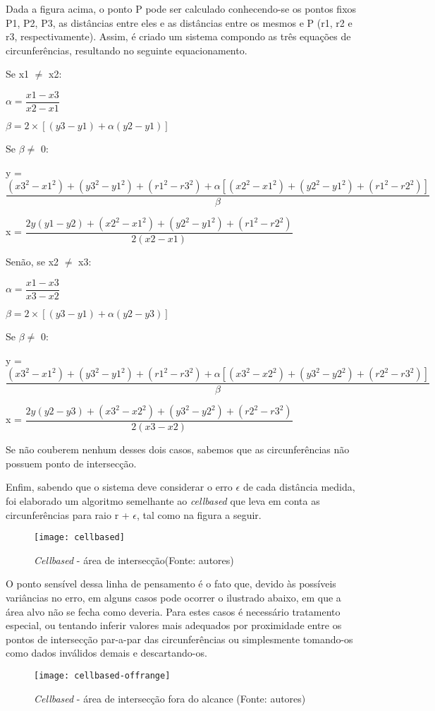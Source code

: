 Dada a figura acima, o ponto P pode ser calculado conhecendo-se os pontos fixos P1, P2, P3, as distâncias entre eles e as distâncias entre os mesmos e P (r1, r2 e r3, respectivamente). Assim, é criado um sistema compondo as três equações de circunferências, resultando no seguinte equacionamento.

Se x1 $\neq$ x2:

\quad $\alpha = \dfrac{x1 - x3}{x2 - x1}$

\quad $\beta = 2 \times [(y3 - y1) + \alpha(y2 - y1)]$

\quad Se $\beta \neq$ 0:

\quad \quad y = $\dfrac{(x3^2 - x1^2) + (y3^2 - y1^2) + (r1^2 - r3^2) + \alpha[(x2^2 - x1^2) + (y2^2 - y1^2) + (r1^2 - r2^2)]}{\beta}$

\quad \quad x = $\dfrac{2y(y1 - y2) + (x2^2 - x1^2) + (y2^2 - y1^2) + (r1^2 - r2^2)}{2(x2 - x1)}$

Senão, se x2 $\neq$ x3:

\quad $\alpha = \dfrac{x1 - x3}{x3 - x2}$

\quad $\beta = 2 \times [(y3 - y1) + \alpha(y2 - y3)]$

\quad Se $\beta \neq$ 0:

\quad \quad y = $\dfrac{(x3^2 - x1^2) + (y3^2 - y1^2) + (r1^2 - r3^2) + \alpha[(x3^2 - x2^2) + (y3^2 - y2^2) + (r2^2 - r3^2)]}{\beta}$

\quad \quad x = $\dfrac{2y(y2 - y3) + (x3^2 - x2^2) + (y3^2 - y2^2) + (r2^2 - r3^2)}{2(x3 - x2)}$

Se não couberem nenhum desses dois casos, sabemos que as circunferências não possuem ponto de intersecção.

Enfim, sabendo que o sistema deve considerar o erro $\epsilon$ de cada distância medida, foi elaborado um algoritmo semelhante ao \emph{cellbased} \cite{larissaamaralmiltonbiscaro} que leva em conta as circunferências para raio r + $\epsilon$, tal como na figura a seguir.

\begin{figure}[ht]
  \centering
    \texttt{[image: cellbased]}
  \caption{\emph{Cellbased} - área de intersecção(Fonte: autores)}
\end{figure}
\FloatBarrier

O ponto sensível dessa linha de pensamento é o fato que, devido às possíveis variâncias no erro, em alguns casos pode ocorrer o ilustrado abaixo, em que a área alvo não se fecha como deveria. Para estes casos é necessário tratamento especial, ou tentando inferir valores mais adequados por proximidade entre os pontos de intersecção par-a-par das circunferências ou simplesmente tomando-os como dados inválidos demais e descartando-os.

\begin{figure}[ht]
  \centering
    \texttt{[image: cellbased-offrange]}
  \caption{\emph{Cellbased} - área de intersecção fora do alcance (Fonte: autores)}
\end{figure}
\FloatBarrier
